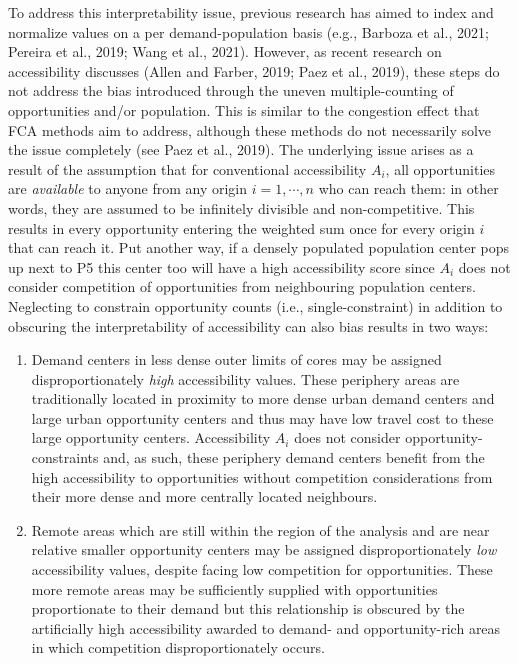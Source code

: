 \documentclass[]{elsarticle} %
\begin{document}
To address this interpretability issue, previous research has aimed to
index and normalize values on a per demand-population basis (e.g.,
Barboza et al., 2021; Pereira et al., 2019; Wang et al., 2021). However,
as recent research on accessibility discusses (Allen and Farber, 2019;
Paez et al., 2019), these steps do not address the bias introduced
through the uneven multiple-counting of opportunities and/or population.
This is similar to the congestion effect that FCA methods aim to
address, although these methods do not necessarily solve the issue
completely (see Paez et al., 2019). The underlying issue arises as a
result of the assumption that for conventional accessibility \(A_i\),
all opportunities are \emph{available} to anyone from any origin
\(i=1,\cdots,n\) who can reach them: in other words, they are assumed to
be infinitely divisible and non-competitive. This results in every
opportunity entering the weighted sum once for every origin \(i\) that
can reach it. Put another way, if a densely populated population center
pops up next to P5 this center too will have a high accessibility score
since \(A_i\) does not consider competition of opportunities from
neighbouring population centers. Neglecting to constrain opportunity
counts (i.e., single-constraint) in addition to obscuring the
interpretability of accessibility can also bias results in two ways:

\begin{enumerate}
\def\labelenumi{\arabic{enumi})}
\item
  Demand centers in less dense outer limits of cores may be assigned
  disproportionately \emph{high} accessibility values. These periphery
  areas are traditionally located in proximity to more dense urban
  demand centers and large urban opportunity centers and thus may have
  low travel cost to these large opportunity centers. Accessibility
  \(A_i\) does not consider opportunity-constraints and, as such, these
  periphery demand centers benefit from the high accessibility to
  opportunities without competition considerations from their more dense
  and more centrally located neighbours.
\item
  Remote areas which are still within the region of the analysis and are
  near relative smaller opportunity centers may be assigned
  disproportionately \emph{low} accessibility values, despite facing low
  competition for opportunities. These more remote areas may be
  sufficiently supplied with opportunities proportionate to their demand
  but this relationship is obscured by the artificially high
  accessibility awarded to demand- and opportunity-rich areas in which
  competition disproportionately occurs.
\end{enumerate}
\end{document}
